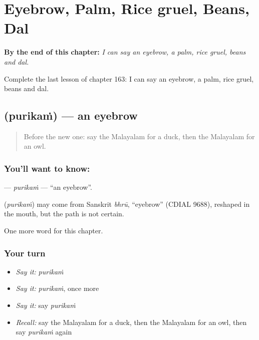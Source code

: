 
\chapter{Eyebrow, Palm, Rice gruel, Beans, Dal}
\label{ch:ml-eyebrow-palm-rice-gruel-beans-dal}

\begin{chapteropening}
\textbf{By the end of this chapter:} \emph{I can say an eyebrow, a palm, rice gruel, beans and dal.}

Complete the last lesson of chapter 163: I can say an eyebrow, a palm, rice gruel, beans and dal.
\end{chapteropening}

\section[\texorpdfstring{\ml{പുരികം} (purikaṁ)}{പുരികം (purikaṁ)}]{ (purikaṁ) — an eyebrow}

\label{lesson:ML-C163-purikam}



\begin{quote}
Before the new one: say the Malayalam for a duck, then the Malayalam for an owl.
\end{quote}

\subsection*{You'll want to know: }
\textbf{} — \emph{purikaṁ} — \textquotedblleft{}an eyebrow\textquotedblright{}.

\begin{cousinweb}
\textbf{} (\emph{purikaṁ}) may come from Sanskrit \emph{bhrū}, \textquotedblleft{}eyebrow\textquotedblright{} (CDIAL 9688), reshaped in the mouth, but the path is not certain.
\end{cousinweb}

\begin{grammarlens}[title={What you've built}]
One more word for this chapter.
\end{grammarlens}

\subsection*{Your turn}
\begin{itemize}
\raggedright
  \item \emph{Say it:} \emph{purikaṁ}
  \item \emph{Say it:} \emph{purikaṁ}, once more
  \item \emph{Say it:} say \emph{purikaṁ}
  \item \emph{Recall:} say the Malayalam for a duck, then the Malayalam for an owl, then say \emph{purikaṁ} again
\end{itemize}

